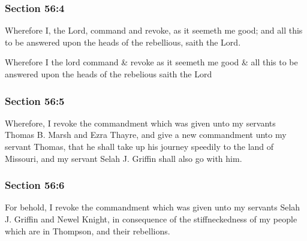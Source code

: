 	\subsubsection{Section 56:4} %
		\label{DC56-4}

		Wherefore I, the Lord, command and revoke, as it seemeth me good; and all this to be answered upon the heads of the rebellious, saith the Lord.

		\begin{framed}
		\scriptsize
			\begin{compactdesc}
				\item[JSP] Wherefore I the lord command \& revoke as it seemeth me good \& all this to be answered upon the heads of the rebelious saith the Lord
			\end{compactdesc}
		\end{framed}

	\subsubsection{Section 56:5} %
		\label{DC56-5}

		Wherefore, I revoke the commandment which was given unto my servants Thomas B. Marsh and Ezra Thayre, and give a new commandment unto my servant Thomas, that he shall take up his journey speedily to the land of Missouri, and my servant Selah J. Griffin shall also go with him.


	\subsubsection{Section 56:6} %
		\label{DC56-6}

		For behold, I revoke the commandment which was given unto my servants Selah J. Griffin and Newel Knight, in consequence of the stiffneckedness of my people which are in Thompson, and their rebellions.

